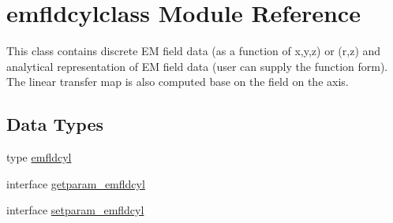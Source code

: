\hypertarget{namespaceemfldcylclass}{}\section{emfldcylclass Module Reference}
\label{namespaceemfldcylclass}


This class contains discrete EM field data (as a function of x,y,z) or (r,z) and analytical representation of EM field data (user can supply the function form). The linear transfer map is also computed base on the field on the axis.  


\subsection*{Data Types}
\begin{DoxyCompactItemize}
\item 
type \mbox{\hyperlink{namespaceemfldcylclass_structemfldcylclass_1_1emfldcyl}{emfldcyl}}
\item 
interface \mbox{\hyperlink{interfaceemfldcylclass_1_1getparam__emfldcyl}{getparam\+\_\+emfldcyl}}
\item 
interface \mbox{\hyperlink{interfaceemfldcylclass_1_1setparam__emfldcyl}{setparam\+\_\+emfldcyl}}
\end{DoxyCompactItemize}
